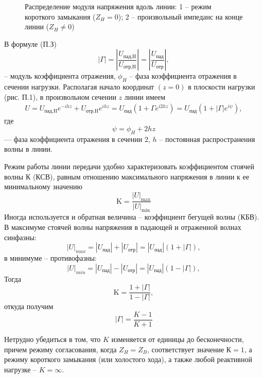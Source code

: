 \begin{figure}[h!]
	\centering
	\caption{Распределение модуля напряжения вдоль линии: 1 -- режим короткого замыкания ($Z_H=0$); 2 -- произвольный импеданс на конце линии ($Z_H\ne0$)}
	\label{fig:p1}
\end{figure}
В формуле (П.З)
\begin{equation}
	|\Gamma|=\left|\frac{U_\text{пад,H}}{U_\text{отр,H}}\right|=\left|\frac{U_\text{пад}}{U_\text{отр}}\right|,
\end{equation}
-- модуль коэффициента отражения, $\phi_H$ -- фаза коэффициента отражения в сечении нагрузки. Располагая начало координат $(z = 0)$ в плоскости нагрузки (рис. П.1), в произвольном сечении $z$ линии имеем
\begin{gather}
	U=U_\text{пад,H}e^{-ihz}+U_\text{отр,H}e^{ihz}
		=U_\text{пад}(1+\Gamma e^{i2hz})
		=U_\text{пад}(1+|\Gamma|e^{i\psi}),
\end{gather}
где
\begin{equation}
	\psi=\phi_H+2hz
\end{equation}
--- фаза коэффициента отражения в сечении 2, $h$ -- постоянная распространения волны в линии.

Режим работы линии передачи удобно характеризовать коэффициентом стоячей волны К (КСВ), равным отношению максимального напряжения в линии к ее минимальному значению
\begin{equation}
	\mathrm { K } = \frac { | U | _ { \max } } { | U | _ { \min } }
\end{equation}
Иногда используется и обратная величина -- коэффициент бегущей волны (КБВ). В максимуме стоячей волны напряжения в падающей и отраженной волнах синфазны:
\begin{equation}
	|U|_{max}=|U_\text{пад}|+|U_\text{отр}|=|U_\text{пад}|(1+|\Gamma|),
\end{equation}
в минимуме -- противофазны:
\begin{equation}
	|U|_{min}=|U_\text{пад}|-|U_\text{отр}|=|U_\text{пад}|(1-|\Gamma|),
\end{equation}
Тогда
\begin{equation}
	\mathrm { K } = \frac { 1 + | \Gamma | } { 1 - | \Gamma | },
\end{equation}
откуда получим
\begin{equation}
	| \Gamma | = \frac { K - 1 } { K + 1 }
\end{equation}

Нетрудно убедиться в том, что $K$ изменяется от единицы до бесконечности, причем режиму согласования, когда $Z_H = Z_B$, соответствует значение $\mathrm{К}=1$, а режиму короткого замыкания (или холостого хода), а также любой реактивной нагрузке -- $K=\infty$.

